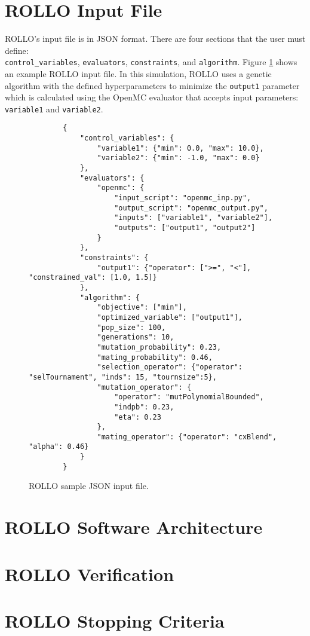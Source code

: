 \section{ROLLO Input File}
\gls{ROLLO}'s input file is in JSON format. 
There are four sections that the user must define: \\ \texttt{control\_variables}, 
\texttt{evaluators}, \texttt{constraints}, and \texttt{algorithm}. 
Figure \ref{fig:rollo-input} shows an example \gls{ROLLO} input file. 
In this simulation, \gls{ROLLO} uses a genetic algorithm with the defined 
hyperparameters to minimize the \texttt{output1} parameter which is 
calculated using the OpenMC evaluator that accepts input parameters: 
\texttt{variable1} and \texttt{variable2}. 
\begin{figure}[]
    \begin{verbatim}
        {
            "control_variables": {
                "variable1": {"min": 0.0, "max": 10.0}, 
                "variable2": {"min": -1.0, "max": 0.0}
            }, 
            "evaluators": {
                "openmc": {
                    "input_script": "openmc_inp.py",
                    "output_script": "openmc_output.py", 
                    "inputs": ["variable1", "variable2"],
                    "outputs": ["output1", "output2"]
                }
            }, 
            "constraints": {
                "output1": {"operator": [">=", "<"], "constrained_val": [1.0, 1.5]}
            }, 
            "algorithm": {
                "objective": ["min"], 
                "optimized_variable": ["output1"], 
                "pop_size": 100, 
                "generations": 10, 
                "mutation_probability": 0.23,
                "mating_probability": 0.46,
                "selection_operator": {"operator": "selTournament", "inds": 15, "tournsize":5},
                "mutation_operator": {
                    "operator": "mutPolynomialBounded",
                    "indpb": 0.23,
                    "eta": 0.23
                },
                "mating_operator": {"operator": "cxBlend", "alpha": 0.46}
            }
        }
    \end{verbatim}
    \caption{\acrfull{ROLLO} sample JSON input file.}
    \label{fig:rollo-input}
\end{figure}


\section{ROLLO Software Architecture}

\section{ROLLO Verification}

\section{ROLLO Stopping Criteria}